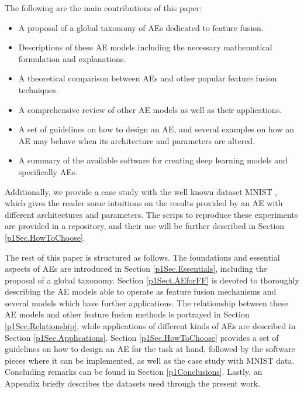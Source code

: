     The following are the main contributions of this paper:
    \begin{itemize}
	    \item A proposal of a global taxonomy of AEs dedicated to feature fusion.
	
	    \item Descriptions of these AE models including the necessary mathematical formulation and explanations.
	
	    \item A theoretical comparison between AEs and other popular feature fusion techniques.
	    
	    \item A comprehensive review of other AE models as well as their applications.
	      
	    \item A set of guidelines on how to design an AE, and several examples on how an AE may behave when its architecture and parameters are altered.

            \item A summary of the available software for creating deep learning models and specifically AEs.
    \end{itemize}

    Additionally, we provide a case study with the well known dataset MNIST , which gives the reader some intuitions on the results provided by an AE with different architectures and parameters. The scrips to reproduce these experiments are provided in a repository, and their use will be further described in Section \ref{p1Sec.HowToChoose}.

    The rest of this paper is structured as follows. The foundations and essential aspects of AEs are introduced in Section \ref{p1Sec.Essentials}, including the proposal of a global taxonomy. Section \ref{p1Sect.AEforFF} is devoted to thoroughly describing the AE models able to operate as feature fusion mechanisms 
    and several models which have further applications. The relationship between these AE models and other feature fusion methods is portrayed in Section \ref{p1Sec.Relationship}, while applications of different kinds of AEs are described in Section \ref{p1Sec.Applications}. Section \ref{p1Sec.HowToChoose} provides a set of guidelines on how to design an AE for the task at hand, followed by the software pieces where it can be implemented, as well as the case study with MNIST data. Concluding remarks can be found in Section \ref{p1Conclusions}. Lastly, an Appendix briefly describes the datasets used through the present work.

